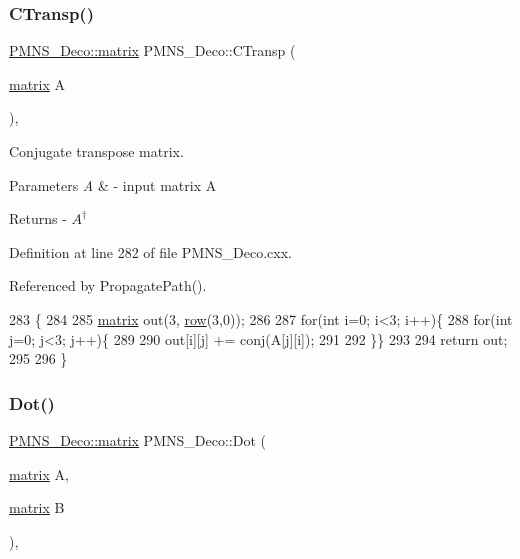 \subsubsection{\texorpdfstring{C\+Transp()}{CTransp()}}
{\footnotesize\ttfamily \hyperlink{classOscProb_1_1PMNS__Deco_a77b4e0c041b6268910a270be0f5387c9}{P\+M\+N\+S\+\_\+\+Deco\+::matrix} P\+M\+N\+S\+\_\+\+Deco\+::\+C\+Transp (\begin{DoxyParamCaption}\item[{\hyperlink{classOscProb_1_1PMNS__Deco_a77b4e0c041b6268910a270be0f5387c9}{matrix}}]{A }\end{DoxyParamCaption})\hspace{0.3cm}{\ttfamily [protected]}, {\ttfamily [virtual]}}

Conjugate transpose matrix.


\begin{DoxyParams}{Parameters}
{\em A} & -\/ input matrix A\\
\hline
\end{DoxyParams}
\begin{DoxyReturn}{Returns}
-\/ $A^{\dagger}$ 
\end{DoxyReturn}


Definition at line 282 of file P\+M\+N\+S\+\_\+\+Deco.\+cxx.



Referenced by Propagate\+Path().


\begin{DoxyCode}
283 \{
284 
285   \hyperlink{classOscProb_1_1PMNS__Deco_a77b4e0c041b6268910a270be0f5387c9}{matrix} out(3, \hyperlink{classOscProb_1_1PMNS__Deco_a430859c3da89582de577f8f7e75f2d16}{row}(3,0));
286   
287   \textcolor{keywordflow}{for}(\textcolor{keywordtype}{int} i=0; i<3; i++)\{
288   \textcolor{keywordflow}{for}(\textcolor{keywordtype}{int} j=0; j<3; j++)\{
289   
290     out[i][j] += conj(A[j][i]);
291 
292   \}\}
293   
294   \textcolor{keywordflow}{return} out;
295 
296 \}
\end{DoxyCode}
\mbox{\label{classOscProb_1_1PMNS__Deco_a8d6b547de294c0d52d4208bde44fe171}} 
\subsubsection{\texorpdfstring{Dot()}{Dot()}}
{\footnotesize\ttfamily \hyperlink{classOscProb_1_1PMNS__Deco_a77b4e0c041b6268910a270be0f5387c9}{P\+M\+N\+S\+\_\+\+Deco\+::matrix} P\+M\+N\+S\+\_\+\+Deco\+::\+Dot (\begin{DoxyParamCaption}\item[{\hyperlink{classOscProb_1_1PMNS__Deco_a77b4e0c041b6268910a270be0f5387c9}{matrix}}]{A,  }\item[{\hyperlink{classOscProb_1_1PMNS__Deco_a77b4e0c041b6268910a270be0f5387c9}{matrix}}]{B }\end{DoxyParamCaption})\hspace{0.3cm}{\ttfamily [protected]}, {\ttfamily [virtual]}}

